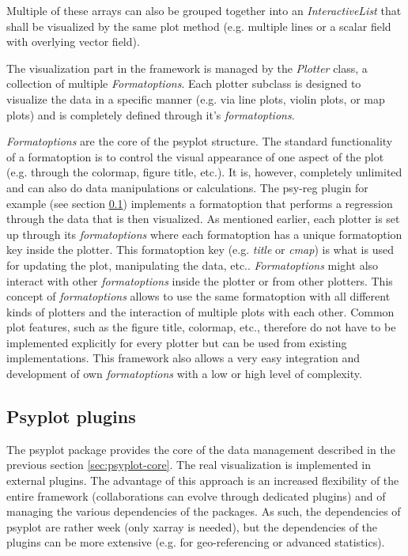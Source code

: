 \documentclass[
11pt, %
english, %
singlespacing, %
headsepline, %
]{article} %
\begin{document}
\begin{refsection}
Multiple of these arrays can also be grouped together into an \textit{InteractiveList} that shall be visualized by the same plot method (e.g. multiple lines or a scalar field with overlying vector field).

The visualization part in the framework is managed by the \textit{Plotter} class, a collection of multiple \textit{Formatoptions}. Each plotter subclass is designed to visualize the data in a specific manner (e.g. via line plots, violin plots, or map plots) and is completely defined through it’s \textit{formatoptions}.

\textit{Formatoptions} are the core of the psyplot structure. The standard functionality of a formatoption is to control the visual appearance of one aspect of the plot (e.g. through the colormap, figure title, etc.). It is, however, completely unlimited and can also do data manipulations or calculations. The psy-reg plugin for example (see section \ref{sec:psyplot-plugins}) implements a formatoption that performs a regression through the data that is then visualized. As mentioned earlier, each plotter is set up through its \textit{formatoptions} where each formatoption has a unique formatoption key inside the plotter. This formatoption key (e.g. \textit{title} or \textit{cmap}) is what is used for updating the plot, manipulating the data, etc.. \textit{Formatoptions} might also interact with other \textit{formatoptions} inside the plotter or from other plotters. This concept of \textit{formatoptions} allows to use the same formatoption with all different kinds of plotters and the interaction of multiple plots with each other. Common plot features, such as the figure title, colormap, etc., therefore do not have to be implemented explicitly for every plotter but can be used from existing implementations. This framework also allows a very easy integration and development of own \textit{formatoptions} with a low or high level of complexity.

\subsection{Psyplot plugins}  \label{sec:psyplot-plugins}

The psyplot package provides the core of the data management described in the previous section \ref{sec:psyplot-core}. The real visualization is implemented in external plugins. The advantage of this approach is an increased flexibility of the entire framework (collaborations can evolve through dedicated plugins) and of managing the various dependencies of the packages. As such, the dependencies of psyplot are rather week (only xarray is needed), but the dependencies of the plugins can be more extensive (e.g. for geo-referencing or advanced statistics). 


\end{refsection}
\end{document}
